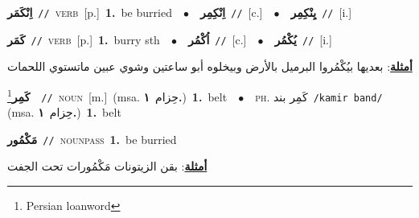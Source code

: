 \documentclass[10pt,a4paper,twoside]{article} %
\begin{document}
\begin{multicols}{2}
{\setlength\topsep{0pt}\textbf{\foreignlanguage{arabic}{اِنْكَمَر}}\ {\color{gray}\texttt{//}\color{black}}\ \textsc{verb}\ [p.]\ \textbf{1.}~be burried\ \ $\bullet$\ \ \setlength\topsep{0pt}\textbf{\foreignlanguage{arabic}{اِنْكِمِر}}\ {\color{gray}\texttt{//}\color{black}}\ [c.]\ \ $\bullet$\ \ \setlength\topsep{0pt}\textbf{\foreignlanguage{arabic}{يِنْكِمِر}}\ {\color{gray}\texttt{//}\color{black}}\ [i.]\ } \vspace{2mm}

{\setlength\topsep{0pt}\textbf{\foreignlanguage{arabic}{كَمَر}}\ {\color{gray}\texttt{//}\color{black}}\ \textsc{verb}\ [p.]\ \textbf{1.}~burry sth\ \ $\bullet$\ \ \setlength\topsep{0pt}\textbf{\foreignlanguage{arabic}{اُكْمُر}}\ {\color{gray}\texttt{//}\color{black}}\ [c.]\ \ $\bullet$\ \ \setlength\topsep{0pt}\textbf{\foreignlanguage{arabic}{يُكْمُر}}\ {\color{gray}\texttt{//}\color{black}}\ [i.]\  \begin{flushright}\color{gray}\foreignlanguage{arabic}{\textbf{\underline{\foreignlanguage{arabic}{أمثلة}}}: بعديها بيُكْمُروا البرميل بالأرض وبيخلوه أبو ساعتين وشوي عبين ماتستوي اللحمات}\end{flushright}\color{black}} \vspace{2mm}

{\setlength\topsep{0pt}\textbf{\foreignlanguage{arabic}{كَمِر}}\footnote{Persian loanword}\ \ {\color{gray}\texttt{//}\color{black}}\ \textsc{noun}\ [m.]\ \color{gray}(msa. \foreignlanguage{arabic}{حِزام}~\foreignlanguage{arabic}{\textbf{١.}})\color{black}\ \textbf{1.}~belt\ \ $\bullet$\ \ \textsc{ph.} \color{gray} \foreignlanguage{arabic}{كَمِر بند}\color{black}\ {\color{gray}\texttt{/{\sffamily kamir band}/}\color{black}}\ \color{gray} (msa. \foreignlanguage{arabic}{حِزام}~\foreignlanguage{arabic}{\textbf{١.}})\color{black}\ \textbf{1.}~belt\ } \vspace{2mm}

{\setlength\topsep{0pt}\textbf{\foreignlanguage{arabic}{مَكْمُور}}\ {\color{gray}\texttt{//}\color{black}}\ \textsc{noun\textunderscore pass}\ \textbf{1.}~be burried\  \begin{flushright}\color{gray}\foreignlanguage{arabic}{\textbf{\underline{\foreignlanguage{arabic}{أمثلة}}}: بقن الزيتونات مَكْمُورات تحت الجفت}\end{flushright}\color{black}} \vspace{2mm}


\end{multicols}
\end{document}
